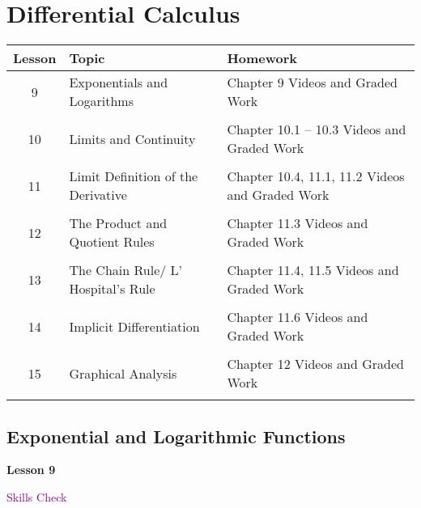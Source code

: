 \documentclass[10pt]{book}
\theoremstyle{definition}
\theoremstyle{remark}
\begin{document}
\chapter{Differential Calculus}

\begin{tabular}{cp{2.15in}p{3.25in}}
Lesson & Topic & Homework\\
\hline
9	&	Exponentials and	Logarithms		&	Chapter 9 Videos and Graded Work\\ \\
10	&	Limits and Continuity			&	Chapter 10.1 -- 10.3 Videos and Graded Work\\\\
11	&	Limit Definition of the Derivative	&	Chapter 10.4, 11.1, 11.2 Videos and Graded Work\\\\
12	&	The Product and Quotient Rules	&	Chapter 11.3 Videos and Graded Work\\\\
13	&	The Chain Rule/ L' Hospital's Rule	&	Chapter 11.4, 11.5 Videos and Graded Work\\\\
14	&	Implicit Differentiation			&	Chapter 11.6 Videos and Graded Work\\\\
15	&	Graphical Analysis				&	Chapter 12 Videos and Graded Work\\\\
\end{tabular}
\newpage


\section{Exponential and Logarithmic Functions}
\begin{tcolorbox}[
  width=\textwidth,
  colback=gray!10, %
  colframe=white, %
  boxrule=0pt,    %
  left=1cm,       %
  right=1cm,      %
  sharp corners  %
]

\begin{minipage}[t]{0.5\textwidth}
  \Huge \textbf{Lesson 9}
\end{minipage}%
\hfill
\begin{minipage}[t]{0.5\textwidth}
  \Huge \textcolor{purple}{Skills Check}
\end{minipage}
\end{tcolorbox}
\end{document}
